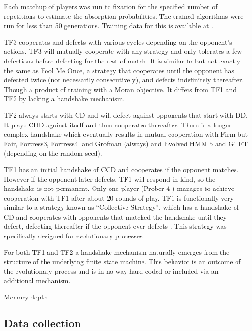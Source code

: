 \documentclass{article}
\begin{document}
Each matchup of players was run to fixation for the specified number of
repetitions to estimate the absorption probabilities. The trained algorithms
were run for less than 50 generations. Training data for this is available at
\cite{data}.

TF3 cooperates and defects with
various cycles depending on the opponent's actions. TF3 will mutually
cooperate with any strategy and only tolerates a few defections before
defecting for the rest of match. It is similar to but not exactly the same as
Fool Me Once, a strategy that cooperates until the opponent has defected twice
(not necessarily consecutively), and defects indefinitely thereafter. Though a
product of training with a Moran objective. It differs from TF1 and TF2
by lacking a handshake mechanism.

TF2 always starts with CD and will defect against opponents that start with
DD\@. It plays CDD against itself and then cooperates thereafter. There is a
longer complex handshake which eventually results in mutual cooperation with
Firm but Fair, Fortress3, Fortress4, and Grofman (always) and Evolved HMM 5 and
GTFT (depending on the random seed).

TF1 has an initial handshake of CCD and cooperates if the opponent matches.
However if the opponent later defects, TF1 will respond in kind, so the
handshake is not permanent. Only one player (Prober 4 \cite{prison}) manages to
achieve cooperation with TF1 after about 20 rounds of play. TF1 is functionally
very similar to a strategy known as ``Collective Strategy'', which has a
handshake of CD and cooperates with opponents that matched the handshake
until they defect, defecting thereafter if the opponent ever defects \cite{Li2009}.
This strategy was specifically designed for evolutionary processes.

For both TF1 and TF2 a handshake
mechanism naturally emerges from the structure of the underlying finite state
machine. This behavior is an outcome of the evolutionary process and is in no
way hard-coded or included via an additional mechanism.

\begin{table}[!hbtp]
    \centering
        
        \caption{Memory depth}
        \label{tbl:memory_depth_count}
\end{table}

\subsection{Data collection}\label{sec:data_collection}
\end{document}
